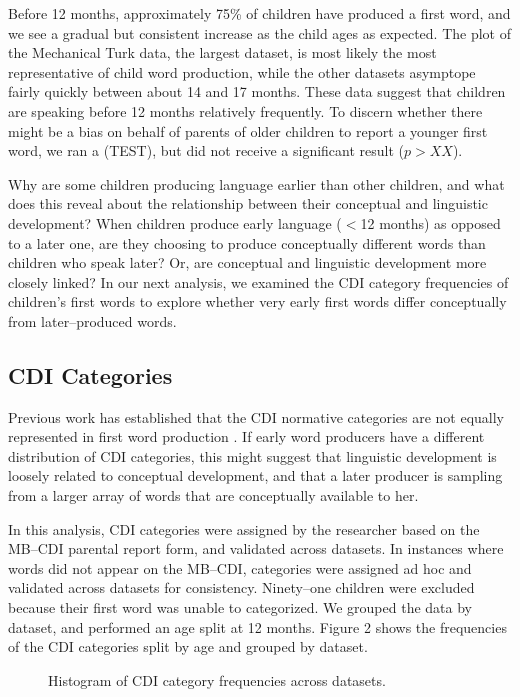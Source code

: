 \documentclass[10pt,letterpaper]{article}
\begin{document}
Before 12 months, approximately 75\% of children have produced a first word, and we see a gradual but consistent increase as the child ages as expected. The plot of the Mechanical Turk data, the largest dataset, is most likely the most representative of child word production, while the other datasets asymptope fairly quickly between about 14 and 17 months. 
These data suggest that children are speaking before 12 months relatively frequently. To discern whether there might be a bias on behalf of parents of older children to report a younger first word, we ran a (TEST), but did not receive a significant result ($p > XX$).

Why are some children producing language earlier than other children, and what does this reveal about the relationship between their conceptual and linguistic development? When children produce early language ($<$12 months) as opposed to a later one, are they choosing to produce conceptually different words than children who speak later? Or, are conceptual and linguistic development more closely linked? In our next analysis, we examined the CDI category frequencies of children's first words to explore whether very early first words differ conceptually from later--produced words. 

\subsection{CDI Categories} 
Previous work has established that the CDI normative categories are not equally represented in first word production \cite{fenson1994}. If early word producers have a different distribution of CDI categories, this might suggest that linguistic development is loosely related to conceptual development, and that a later producer is sampling from a larger array of words that are conceptually available to her.

In this analysis, CDI categories were assigned by the researcher based on the MB--CDI parental report form, and validated across datasets. In instances where words did not appear on the MB--CDI, categories were assigned ad hoc and validated across datasets for consistency. Ninety--one children were excluded because their first word was unable to categorized. We grouped the data by dataset, and performed an age split at 12 months. Figure 2 shows the frequencies of the CDI categories split by age and grouped by dataset.

\begin{figure}[tb]
\caption{\label{fig:cdfs} Histogram of CDI category frequencies across datasets.}
\end{figure}
\end{document}
